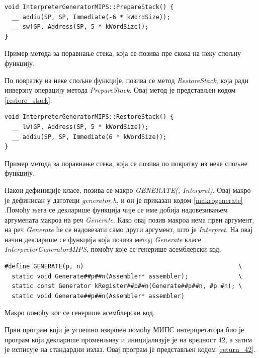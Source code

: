 \documentclass[12pt,oneside]{memoir}
\begin{document}
\begin{listing}
\begin{verbatim}
void InterpreterGeneratorMIPS::PrepareStack() {
  __ addiu(SP, SP, Immediate(-6 * kWordSize));
  __ sw(GP, Address(SP, 5 * kWordSize));
}
\end{verbatim}
\caption{Пример метода за поравнање стека, која се позива пре скока на неку спољну функцију.}
\label{prepare_stack}
\end{listing}

По повратку из неке спољне функције, позива се метод \textit{RestoreStack}, која ради инверзну операцију метода \textit{PrepareStack}. Овај метод је представљен кодом \ref{restore_stack}.

\begin{listing}
\begin{verbatim}
void InterpreterGeneratorMIPS::RestoreStack() {
  __ lw(GP, Address(SP, 5 * kWordSize));
  __ addiu(SP, SP, Immediate(6 * kWordSize));
}
\end{verbatim}
\caption{Пример метода за поравнање стека, која се позива по повратку из неке спољне функцију.}
\label{restore_stack}
\end{listing}

Након дефиниције класе, позива се макро \textit{GENERATE(, Interpret)}. Овај макро је дефинисан у датотеци \textit{generator.h}, и он је приказан кодом \ref{makrogenerate} .Помоћу њега се декларише функција чије се име добија надовезивањем аргумената макроа на реч \textit{Generate}. Како овај позив макроа нема први аргумент, на реч \textit{Generate} ће се надовезати само други аргумент, што је \textit{Interpret}. На овај начин декларише се функција која позива метод \textit{Generate} класе \textit{InterpreterGeneratorMIPS}, помоћу које се генерише асемблерски код.

\begin{listing}
\begin{verbatim}
#define GENERATE(p, n)                                           \
  static void Generate##p##n(Assembler* assembler);              \
  static const Generator kRegister##p##n(Generate##p##n, #p #n); \
  static void Generate##p##n(Assembler* assembler)
\end{verbatim}
\caption{Макро помоћу ког се генерише асемблерски код.}
\label{makrogenerate}
\end{listing}

Први програм који је успешно извршен помоћу МИПС интерпретатора био је програм који декларише променљиву и иницијализује је на вредност 42, а затим је исписује на стандардни излаз. Овај програм је представљен кодом \ref{return_42}.
\end{document}
